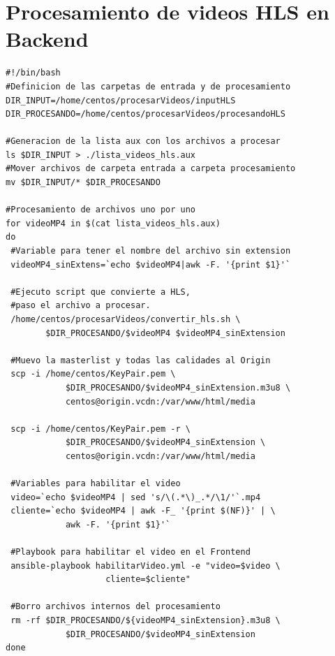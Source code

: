 \documentclass[12pt,a4paper,oneside]{book}
\begin{document}
\section{Procesamiento de videos HLS en Backend}
\label{seccC.3}

\vspace{0.5cm}
\begin{lstlisting}[style=codigobase,  caption= procesar\_videos\_hls.sh]
#!/bin/bash
#Definicion de las carpetas de entrada y de procesamiento
DIR_INPUT=/home/centos/procesarVideos/inputHLS
DIR_PROCESANDO=/home/centos/procesarVideos/procesandoHLS

#Generacion de la lista aux con los archivos a procesar
ls $DIR_INPUT > ./lista_videos_hls.aux
#Mover archivos de carpeta entrada a carpeta procesamiento
mv $DIR_INPUT/* $DIR_PROCESANDO

#Procesamiento de archivos uno por uno
for videoMP4 in $(cat lista_videos_hls.aux)
do
 #Variable para tener el nombre del archivo sin extension
 videoMP4_sinExtens=`echo $videoMP4|awk -F. '{print $1}'`
 
 #Ejecuto script que convierte a HLS, 
 #paso el archivo a procesar. 
 /home/centos/procesarVideos/convertir_hls.sh \
        $DIR_PROCESANDO/$videoMP4 $videoMP4_sinExtension
 
 #Muevo la masterlist y todas las calidades al Origin
 scp -i /home/centos/KeyPair.pem \
            $DIR_PROCESANDO/$videoMP4_sinExtension.m3u8 \
            centos@origin.vcdn:/var/www/html/media
 
 scp -i /home/centos/KeyPair.pem -r \
            $DIR_PROCESANDO/$videoMP4_sinExtension \
            centos@origin.vcdn:/var/www/html/media
 
 #Variables para habilitar el video
 video=`echo $videoMP4 | sed 's/\(.*\)_.*/\1/'`.mp4
 cliente=`echo $videoMP4 | awk -F_ '{print $(NF)}' | \
            awk -F. '{print $1}'` 
 
 #Playbook para habilitar el video en el Frontend
 ansible-playbook habilitarVideo.yml -e "video=$video \
                    cliente=$cliente"
 
 #Borro archivos internos del procesamiento
 rm -rf $DIR_PROCESANDO/${videoMP4_sinExtension}.m3u8 \
            $DIR_PROCESANDO/$videoMP4_sinExtension
done
\end{lstlisting}
\vspace{0.5cm}
\end{document}
